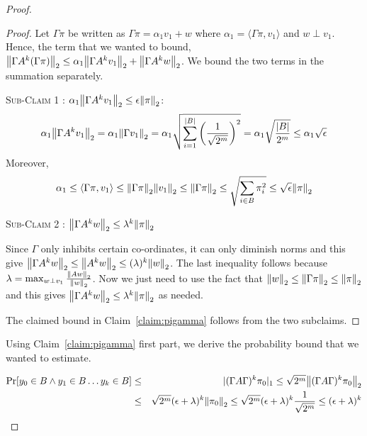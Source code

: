 \begin{proof}
\begin{proof}
Let $\Gamma\pi$ be written as $\Gamma\pi = \alpha_1 v_1 + w$ where $\alpha_1 = \langle \Gamma \pi, v_1 \rangle$ and $w \perp v_1$. 
Hence, the term that we wanted to bound, ${\left\lVert\Gamma A^k (\Gamma \pi)\right\rVert}_2 \le \alpha_1 {\left\lVert\Gamma A^k v_1\right\rVert}_2 + {\left\lVert\Gamma A^k w\right\rVert}_2$. We bound the two terms in the summation separately.
\begin{description}
\item{\textsc{Sub-Claim 1} : ${\alpha_1 {\left\lVert\Gamma A^k v_1\right\rVert}_2 \le \epsilon{\left\lVert\pi\right\rVert}_2}$:}
$$ \alpha_1 {\left\lVert\Gamma A^k v_1\right\rVert}_2 = \alpha_1 {\left\lVert\Gamma v_1\right\rVert}_2 = \alpha_1 \sqrt{\sum_{i=1}^{|B|} \left( \frac{1}{\sqrt{2^{m}}} \right)^2 } = \alpha_1 \sqrt{\frac{|B|}{2^m}} \le \alpha_1 \sqrt{\epsilon}$$
Moreover, 
$$
\alpha_1 \le \langle \Gamma \pi, v_1 \rangle \le {\left\lVert\Gamma \pi\right\rVert}_2{\left\lVert v_1\right\rVert}_2 \le {\left\lVert\Gamma \pi\right\rVert}_2 \le \sqrt{\sum_{i \in B} \pi_i^2} \le  \sqrt{\epsilon} {\left\lVert\pi\right\rVert}_2
$$

\item{\textsc{Sub-Claim 2} : ${\left\lVert\Gamma A^k w\right\rVert}_2 \le \lambda^k{\left\lVert\pi\right\rVert}_2$}

Since $\Gamma$ only inhibits certain co-ordinates, it can only diminish norms and this give ${\left\lVert\Gamma A^k w\right\rVert}_2 \le {\left\lVert A^kw\right\rVert}_2 \le (\lambda)^k{\left\lVert w\right\rVert}_2$. The last inequality follows because  $\lambda = \max_{w \perp v_1} \frac{{\left\lVert Aw\right\rVert}_2}{{\left\lVert w\right\rVert}_2}$. Now we just need to use the fact that ${\left\lVert w\right\rVert}_2 \le {\left\lVert\Gamma \pi\right\rVert}_2 \le {\left\lVert\pi\right\rVert}_2 $ and this gives ${\left\lVert\Gamma A^k w\right\rVert}_2 \le \lambda^k{\left\lVert\pi\right\rVert}_2$ as needed.
\end{description} 

\noindent The claimed bound in Claim~\ref{claim:pigamma} follows from the two subclaims. 
\end{proof}
\noindent Using Claim~\ref{claim:pigamma} first part, we derive the probability bound that we wanted to estimate.

\begin{eqnarray*}
\Pr[y_0 \in B \land y_1 \in B \ldots y_k \in B] & \le & |(\Gamma A\Gamma)^k \pi_0|_1 \le \sqrt{2^m}{\left\lVert(\Gamma A\Gamma)^k \pi_0\right\rVert}_2\\
& \le & \sqrt{2^m} (\epsilon+\lambda)^k {\left\lVert\pi_0\right\rVert}_2 \le \sqrt{2^m} (\epsilon+\lambda)^k \frac{1}{\sqrt{2^m}} \le (\epsilon+\lambda)^k
\end{eqnarray*}


\end{proof}

